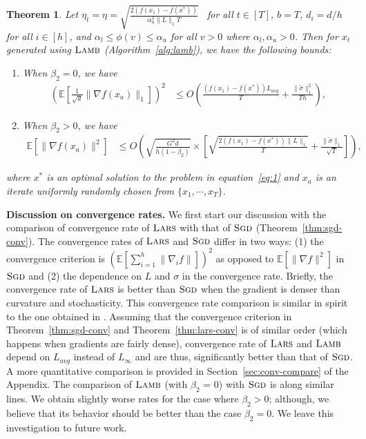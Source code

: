 \documentclass{article} \usepackage{iclr2020_conference,times}
\def\eqref#1{equation~\ref{#1}}
\newtheorem{theorem}{Theorem}
\newcommand{\sgd}{\textsc{Sgd}\xspace}
\newcommand{\lamb}{\textsc{Lamb}}
\newcommand{\lars}{\textsc{Lars}}
\begin{document}
\begin{theorem}
\label{thm:lamb-conv}
Let $\eta_t = \eta = \sqrt{\tfrac{2(f(x_1) - f(x^*))}{\alpha_u^2 \|L\|_1 T}}$ \ for all $t \in [T]$, $b = T$, $d_i = d/h$ for all $i \in [h]$, and $\alpha_l \leq \phi(v) \leq \alpha_u$ for all $v > 0$ where $\alpha_l, \alpha_u > 0$. Then for $x_t$ generated using $\lamb$ (Algorithm~\ref{alg:lamb}), we have the following bounds:
\begin{enumerate}
    \item When $\beta_2 = 0$, we have
    \begin{align*}
\left(\mathbb{E}\left[\frac{1}{\sqrt{d}}\|\nabla f(x_a)\|_1\right]\right)^2 &\leq  O\left(\frac{(f(x_1) - f(x^*))L_{avg}}{T} + \frac{\|\tilde{\sigma}\|^2_1}{Th}\right),
\end{align*}

    \item When $\beta_2 > 0$, we have
    \begin{align*}
 \mathbb{E}[\|\nabla f(x_a)\|^2] &\leq O\left(\sqrt{\frac{G^2 d}{h(1 - \beta_2)}} \times \left[\sqrt{\frac{2(f(x_1) - f(x^*))\|L\|_1}{T}} + \frac{\|\tilde{\sigma}\|_1}{\sqrt{T}} \right]\right),
\end{align*}

\end{enumerate}
where $x^*$ is an optimal solution to the problem in \eqref{eq:1} and $x_a$ is an iterate uniformly randomly chosen from $\{x_1, \cdots, x_T\}$.
\end{theorem}

{\bf Discussion on convergence rates.} We first start our discussion with the comparison of convergence rate of $\lars$ with that of $\sgd$ (Theorem~\ref{thm:sgd-conv}). The convergence rates of $\lars$ and $\sgd$ differ in two ways: (1) the convergence criterion is $(\mathbb{E}[\sum_{i=1}^h \|\nabla_i f\|])^2$ as opposed to $\mathbb{E}[\|\nabla f\|^2]$ in $\sgd$ and (2) the dependence on $L$ and $\sigma$ in the convergence rate. Briefly, the convergence rate of $\lars$ is better than $\sgd$ when the gradient is denser than curvature and stochasticity. This convergence rate comparison is similar in spirit to the one obtained in \citep{signsgd}. Assuming that the convergence criterion in Theorem~\ref{thm:sgd-conv} and Theorem~\ref{thm:lars-conv} is of similar order (which happens when gradients are fairly dense), convergence rate of $\lars$ and $\lamb$ depend on $L_{avg}$ instead of $L_\infty$ and are thus, significantly better than that of $\sgd$. A more quantitative comparison is provided in Section~\ref{sec:conv-compare} of the Appendix. The comparison of $\lamb$ (with $\beta_2$ = 0) with $\sgd$ is along similar lines. We obtain slightly worse rates for the case where $\beta_2 > 0$; although, we believe that its behavior should be better than the case $\beta_2 = 0$. We leave this investigation to future work.  
\end{document}
